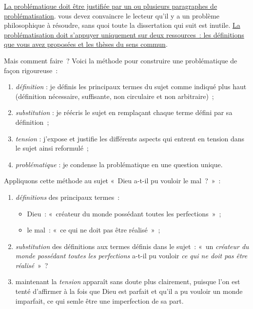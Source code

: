 \documentclass[a4paper,12pt]{article}
\begin{document}
\uline{La problématique doit être justifiée par un ou plusieurs paragraphes de
problématisation}. vous devez convaincre le lecteur qu'il y a un
problème philosophique à résoudre, sans quoi toute la dissertation qui
suit est inutile. \uline{La problématisation doit s'appuyer uniquement sur
deux ressources : les définitions que vous avez proposées et les thèses
du sens commun}.



Mais comment faire ? Voici la méthode pour construire une problématique
de façon rigoureuse :

\begin{enumerate}
\item \emph{définition} : je définis les principaux termes du sujet comme
indiqué plus haut (définition nécessaire, suffisante, non circulaire
et non arbitraire) ;

\item \emph{substitution} : je réécris le sujet en remplaçant chaque terme
défini par sa définition ;

\item \emph{tension} : j'expose et justifie les différents aspects qui entrent
en tension dans le sujet ainsi reformulé ;

\item \emph{problématique} : je condense la problématique en une question
unique.
\end{enumerate}

\noindent Appliquons cette méthode au sujet « Dieu a-t-il pu vouloir le
mal ? » :

\begin{enumerate}
\item \emph{définitions} des principaux termes :

\begin{itemize}
\item Dieu : « créateur du monde possédant toutes les perfections » ;

\item le mal : « ce qui ne doit pas être réalisé » ;
\end{itemize}

\item \emph{substitution} des définitions aux termes définis dans le sujet :
« un \emph{créateur du monde possédant toutes les perfections} a-t-il pu
vouloir \emph{ce qui ne doit pas être réalisé} » ?

\item maintenant la \emph{tension} apparaît sans doute plus clairement, puisque
l'on est tenté d'affirmer à la fois que Dieu est parfait et qu'il a
pu vouloir un monde imparfait, ce qui semle être une imperfection de
sa part.
\end{enumerate}
\end{document}
